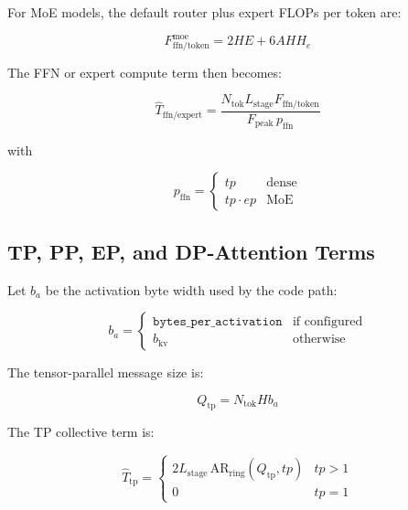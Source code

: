 For MoE models, the default router plus expert FLOPs per token are:

\begin{equation*}
F_{\mathrm{ffn/token}}^{\mathrm{moe}} =
2 H E + 6 A H H_e
\end{equation*}

The FFN or expert compute term then becomes:

\begin{equation*}
\widehat{T}_{\mathrm{ffn/expert}} =
\frac{N_{\mathrm{tok}} L_{\mathrm{stage}} F_{\mathrm{ffn/token}}}
{F_{\mathrm{peak}} \, p_{\mathrm{ffn}}}
\end{equation*}

with

\begin{equation*}
p_{\mathrm{ffn}} =
\begin{cases}
tp & \text{dense} \\
tp \cdot ep & \text{MoE}
\end{cases}
\end{equation*}

\subsection{TP, PP, EP, and DP-Attention Terms}

Let \(b_a\) be the activation byte width used by the code path:

\begin{equation*}
b_a =
\begin{cases}
\texttt{bytes\_per\_activation} & \text{if configured} \\
b_{\mathrm{kv}} & \text{otherwise}
\end{cases}
\end{equation*}

The tensor-parallel message size is:

\begin{equation*}
Q_{\mathrm{tp}} = N_{\mathrm{tok}} H b_a
\end{equation*}

The TP collective term is:

\begin{equation*}
\widehat{T}_{\mathrm{tp}} =
\begin{cases}
2 L_{\mathrm{stage}} \,
\mathrm{AR}_{\mathrm{ring}}(Q_{\mathrm{tp}}, tp) & tp > 1 \\
0 & tp = 1
\end{cases}
\end{equation*}

